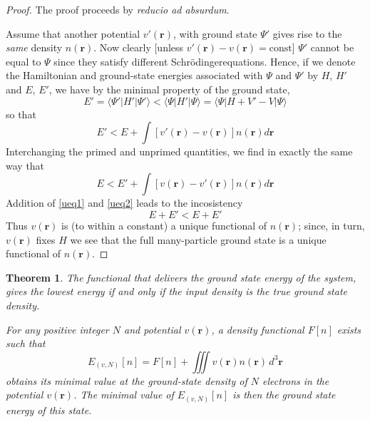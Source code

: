 \documentclass[12pt,a4paper,openany,twoside]{book}
\newtheorem{theorem}{Theorem}[section]
\numberwithin{equation}{section}
\newcommand{\bracketl}[3]{\langle #1 | #2 | #3 \rangle}
\newcommand{\sch}{Schr\"odinger}
\begin{document}
  \begin{proof}
  The proof proceeds by \emph{reducio ad absurdum}. 
  
  Assume that another potential $v'(\textbf{r})$, with ground state $\Psi'$ gives rise to the \emph{same} density $n(\textbf{r})$. Now clearly [unless $v'(\textbf{r})-v(\textbf{r})=\mathrm{const}$] $\Psi'$ cannot be equal to $\Psi$ since they satisfy different \sch equations. Hence, if we denote the Hamiltonian and ground-state energies associated with $\Psi$ and $\Psi'$ by $H$, $H'$ and $E$, $E'$, we have by the minimal property of the ground state,
  \begin{equation}
  E'=\bracketl{\Psi'}{H'}{\Psi'}<\bracketl{\Psi}{H'}{\Psi}=\bracketl{\Psi}{H+V'-V}{\Psi}
  \end{equation}
  so that
  \begin{equation}
  E'<E+\int [v'(\textbf{r})-v(\textbf{r})]n(\textbf{r})d\textbf{r}
  \label{ueq1}
  \end{equation}
  Interchanging the primed and unprimed quantities, we find in exactly the same way that
  \begin{equation}
  E<E'+\int [v(\textbf{r})-v'(\textbf{r})]n(\textbf{r})d\textbf{r}
  \label{ueq2}
  \end{equation}
  Addition of \ref{ueq1} and \ref{ueq2} leads to the incosistency
  \begin{equation}
  E+E'<E+E'
  \end{equation}
  Thus $v(\textbf{r})$ is (to within a constant) a unique functional of $n(\textbf{r})$; since, in turn, $v(\textbf{r})$ fixes $H$ we see that the full many-particle ground state is a unique functional of $n(\textbf{r})$.
  \end{proof}
  
  \begin{theorem}
  The functional that delivers the ground state energy of the system, gives the lowest energy if and only if the input density is the true ground state density.
  
  For any positive integer $N$ and potential $v(\textbf{r})$, a density functional $F[n]$ exists such that
  \begin{equation}
  E_{(v,N)}[n]=F[n]+\iiint v(\textbf{r})n(\textbf{r})\,d^3\textbf{r}
  \end{equation}
  obtains its minimal value at the ground-state density of $N$ electrons in the potential $v(\textbf{r})$. The minimal value of $E_{(v,N)}[n]$ is then the ground state energy of this state.
  
  \end{theorem}
  
\end{document}
